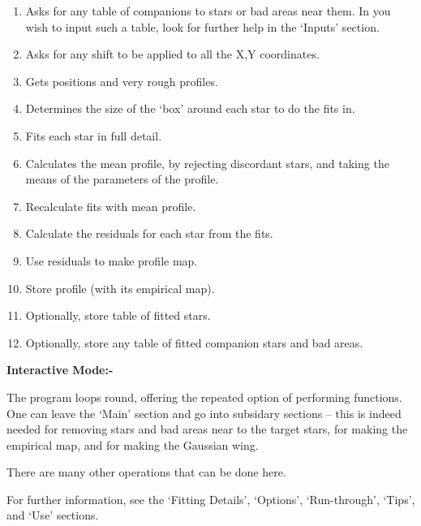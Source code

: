 \begin{small}
{{\begin{enumerate}
\item  Asks for any table of companions to stars or bad areas near them.
       In you wish to input such a table, look for further help in
       the `Inputs' section.

\item  Asks for any shift to be applied to all the X,Y coordinates.

\item  Gets positions and very rough profiles.

\item  Determines the size of the `box' around each star to do the
       fits in.

\item  Fits each star in full detail.

\item  Calculates the mean profile, by rejecting discordant stars, and
       taking the means of the parameters of the profile.

\item  Recalculate fits with mean profile.

\item  Calculate the residuals for each star from the fits.

\item  Use residuals to make profile map.

\item  Store profile (with its empirical map).

\item  Optionally, store table of fitted stars.

\item  Optionally, store any table of fitted companion stars and bad areas.

\end{enumerate}


 {\bf \hspace*{2em} Interactive Mode:-}

 The program loops round, offering the repeated option
 of performing functions. One can leave the `Main' section and
 go into subsidary sections -- this is indeed needed for removing
 stars and bad areas near to the target stars, for making the
 empirical map, and for making the Gaussian wing.

 There are many other operations that can be done here.

 For further information, see the `Fitting Details', `Options',
 `Run-through', `Tips', and `Use' sections.


}}
\end{small}
